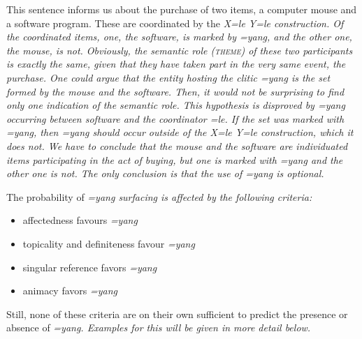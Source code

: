 
This sentence informs us about the purchase of two items, a computer mouse and a software program. These are coordinated by the \em X=le Y=le \em construction. Of the coordinated items, one, the software, is marked by \em =yang\em, and the other one, the mouse, is not. Obviously, the semantic role (\textsc{theme}) of these two participants is exactly the same, given that they have taken part in the very same event, the purchase. One could argue that the entity hosting the clitic \em =yang \em is the set formed by the mouse and the software. Then, it would not be surprising to find only one indication of the semantic role. This hypothesis is disproved by \em =yang \em occurring between \em software \em and the coordinator \em =le\em. If the set was marked with \em =yang\em, then \em =yang \em should occur \em outside \em of the \em X=le Y=le \em construction, which it does not. We have to conclude that the mouse and the software are individuated items participating in the act of buying, but one is marked with \em =yang \em and the other one is not. The only conclusion is that the use of \em =yang \em is optional.

The probability of \em =yang \em surfacing is affected by the following criteria:

\begin{itemize}
	\item affectedness favours \em =yang \em
	\item topicality and definiteness favour \em =yang \em
	\item singular reference favors \em =yang \em
	\item animacy  favors \em =yang \em
\end{itemize}



Still, none of these criteria are on their own sufficient to predict the presence or absence of \em =yang\em. Examples for this will be given in more detail below.

